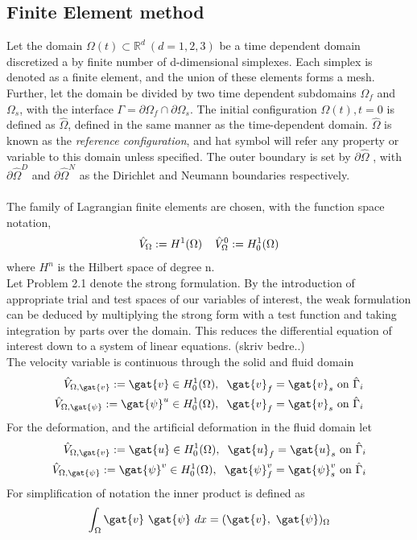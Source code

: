 \subsection{Finite Element method}
Let the domain $\Omega(t) \subset \mathbb{R}^d \ (d = 1, 2, 3) $  be a time dependent domain discretized a by finite number of d-dimensional simplexes.  Each simplex is denoted as a finite element, and the union of these elements forms a mesh. Further, let the domain be divided by two time dependent subdomains $\Omega_f$ and $\Omega_s$, with the interface $\Gamma = \partial \Omega_f \cap \partial \Omega_s$. The initial configuration $\Omega(t), t = 0 $ is defined as $\hat{\Omega}$, defined in the same manner as the time-dependent domain. $\hat{\Omega}$ is  known as the \textit{reference configuration}, and hat symbol will refer any property or variable to this domain unless specified. The outer boundary is set by $\partial \hat{\Omega}$ , with $\partial \hat{\Omega}^D$ and $\partial \hat{\Omega}^N$ as the Dirichlet and Neumann boundaries respectively. \\ \\
The family of Lagrangian finite elements are chosen, with the function space notation,
\begin{align*}
\hat{V}_{\Omega} := H^1(\Omega) \hspace{4mm} 
\hat{V}_{\Omega}^0 := H_0^1(\Omega)  
\end{align*}
where $H^n$ is the Hilbert space of degree n. \\
Let Problem 2.1 denote the strong formulation. By the introduction of appropriate trial and test spaces of our variables of interest, the weak formulation can be deduced by multiplying the strong form with a test function and taking integration by parts over the domain.  This reduces the differential equation of interest down to a system of linear equations. (skriv bedre..) \\
The velocity variable is continuous through the solid and fluid domain
\begin{align*}
\hat{V}_{\Omega, \gat{v}} := \gat{v} \in H_0^1(\Omega), \hspace{2mm} 
\gat{v}_f = \gat{v}_s \ \text{on} \ \hat{\Gamma}_i \\
\hat{V}_{\Omega, \gat{\psi}} := \gat{\psi}^u \in H_0^1(\Omega), \hspace{2mm} 
\gat{v}_f = \gat{v}_s \ \text{on} \ \hat{\Gamma}_i 
\end{align*}
For the deformation, and the artificial deformation in the fluid domain let
\begin{align*}
\hat{V}_{\Omega, \gat{v}} := \gat{u} \in H_0^1(\Omega), \hspace{2mm} 
\gat{u}_f = \gat{u}_s \ \text{on} \ \hat{\Gamma}_i \\
\hat{V}_{\Omega, \gat{\psi}} := \gat{\psi}^v \in H_0^1(\Omega), \hspace{2mm} 
\gat{\psi}_f^v = \gat{\psi}_s^v \ \text{on} \ \hat{\Gamma}_i 
\end{align*}
For simplification of notation the inner product is defined as
\begin{align*}
\int_{\Omega} \gat{v} \ \gat{\psi} \ dx = (\gat{v}, \ \gat{\psi})_{\Omega}
\end{align*}
 

